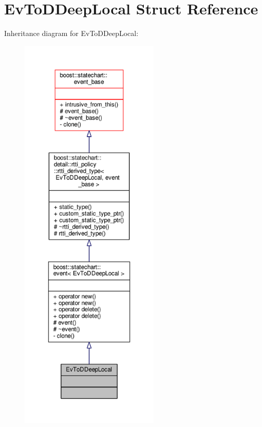 \hypertarget{struct_ev_to_d_deep_local}{}\section{Ev\+To\+D\+Deep\+Local Struct Reference}
\label{struct_ev_to_d_deep_local}


Inheritance diagram for Ev\+To\+D\+Deep\+Local\+:
\nopagebreak
\begin{figure}[H]
\begin{center}
\leavevmode
\includegraphics[height=550pt]{struct_ev_to_d_deep_local__inherit__graph}
\end{center}
\end{figure}



